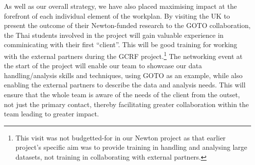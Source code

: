 \documentclass[11pt]{article}
\begin{document}
\vspace{2mm}
\noindent
As well as our overall strategy, we have also placed maximising impact at the forefront of each individual element of the workplan. By visiting the UK to present the outcome of their Newton-funded research to the GOTO collaboration, the Thai students involved in the project will gain valuable experience in comminicating with their first ``client''. This will be good training for working with the external partners during the GCRF project.\footnote{This visit was not budgetted-for in our Newton project as that earlier project's specific aim was to provide training in handling and analysing large datasets, not training in collaborating with external partners.} The networking event at the start of the project will enable our team to showcase our data handling/analysis skills and techniques, using GOTO as an example, while also enabling the external partners to describe the data and analysis needs. This will ensure that the whole team is aware of the needs of the client from the outset, not just the primary contact, thereby facilitating greater collaboration within the team leading to greater impact.
\end{document}
